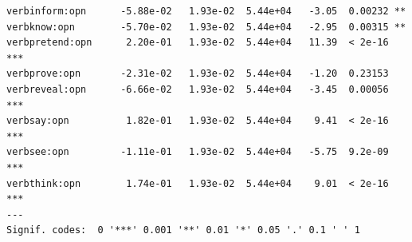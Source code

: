 \documentclass[10pt]{article}\usepackage[]{graphicx}\usepackage[]{color}
\makeatletter
\newenvironment{kframe}{%
 \def\at@end@of@kframe{}%
 \ifinner\ifhmode%
  \def\at@end@of@kframe{\end{minipage}}%
  \begin{minipage}{\columnwidth}%
 \fi\fi%
 \def\FrameCommand##1{\hskip\@totalleftmargin \hskip-\fboxsep
 \colorbox{shadecolor}{##1}\hskip-\fboxsep
     \hskip-\linewidth \hskip-\@totalleftmargin \hskip\columnwidth}%
 \MakeFramed {\advance\hsize-\width
   \@totalleftmargin\z@ \linewidth\hsize
   \@setminipage}}%
 {\par\unskip\endMakeFramed%
 \at@end@of@kframe}
\newenvironment{knitrout}{}{} %
\makeatother
\begin{document}
\begin{knitrout}
\begin{kframe}
\begin{verbatim}
verbinform:opn      -5.88e-02   1.93e-02  5.44e+04   -3.05  0.00232 ** 
verbknow:opn        -5.70e-02   1.93e-02  5.44e+04   -2.95  0.00315 ** 
verbpretend:opn      2.20e-01   1.93e-02  5.44e+04   11.39  < 2e-16 ***
verbprove:opn       -2.31e-02   1.93e-02  5.44e+04   -1.20  0.23153    
verbreveal:opn      -6.66e-02   1.93e-02  5.44e+04   -3.45  0.00056 ***
verbsay:opn          1.82e-01   1.93e-02  5.44e+04    9.41  < 2e-16 ***
verbsee:opn         -1.11e-01   1.93e-02  5.44e+04   -5.75  9.2e-09 ***
verbthink:opn        1.74e-01   1.93e-02  5.44e+04    9.01  < 2e-16 ***
---
Signif. codes:  0 '***' 0.001 '**' 0.01 '*' 0.05 '.' 0.1 ' ' 1
\end{verbatim}
\end{kframe}
\end{knitrout}

% 
% 
% 
% 
% 
% 
% 



\end{document}
